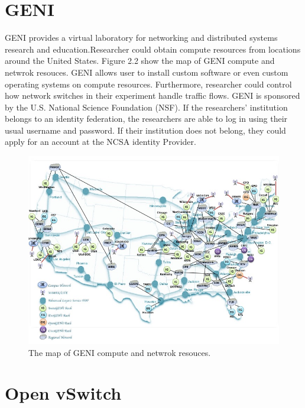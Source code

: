 \documentclass[a4paper,12pt]{report}
\begin{document}
\begin{large}
      \section{GENI}
      \qquad GENI provides a virtual laboratory for networking and 		 distributed systems research and education.Researcher could obtain compute resources from locations around the United States. Figure 2.2 show the map of GENI compute and netwrok resouces. GENI allows user to install custom software or even custom operating systems on compute resources. Furthermore, researcher could control how network switches in their experiment handle traffic flows. GENI is sponsored by the U.S. National Science Foundation (NSF). If the researchers' institution belongs to an identity federation, the researchers are able to log in using their usual username and password. If their institution does not belong, they could apply for an account at the NCSA identity Provider.
      \begin{figure}[h]
          \caption{The map of GENI compute and netwrok resouces.}
          \centering
            \includegraphics[width=1.0\textwidth]{GENI-MAP.jpg}
      \end{figure}
     \section{Open vSwitch}

\end{large}
\end{document}

